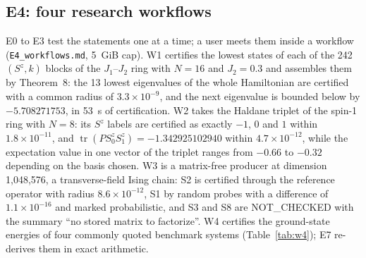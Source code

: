 \documentclass[11pt,a4paper]{article}
\newcommand{\code}[1]{\texttt{#1}}
\newcommand{\status}[1]{\textsf{#1}}
\newcommand{\NC}{\status{NOT\_CHECKED}}
\newcommand{\tr}{\operatorname{tr}}
\begin{document}
\subsection{E4: four research workflows}

E0 to E3 test the statements one at a time; a user meets them inside a workflow (\code{E4\_workflows.md}, 5~GiB cap).
W1 certifies the lowest states of each of the 242 $(S^z,k)$ blocks of the $J_1$--$J_2$ ring with $N=16$ and $J_2=0.3$
and assembles them by Theorem~8: the 13 lowest eigenvalues of the whole Hamiltonian are certified with a common radius
of $3.3\times10^{-9}$, and the next eigenvalue is bounded below by $-5.708271753$, in 53~s of certification. W2 takes
the Haldane triplet of the spin-1 ring with $N=8$: its $S^z$ labels are certified as exactly $-1$, $0$ and $1$ within
$1.8\times10^{-11}$, and $\tr(PS^z_0S^z_1)=-1.342925102940$ within $4.7\times10^{-12}$, while the expectation value in
one vector of the triplet ranges from $-0.66$ to $-0.32$ depending on the basis chosen. W3 is a matrix-free producer
at dimension 1,048,576, a transverse-field Ising chain: S2 is certified through the reference operator with radius
$8.6\times10^{-12}$, S1 by random probes with a difference of $1.1\times10^{-16}$ and marked probabilistic, and S3 and
S8 are \NC{} with the summary ``no stored matrix to factorize''. W4 certifies the ground-state energies of four
commonly quoted benchmark systems (Table~\ref{tab:w4}); E7 re-derives them in exact arithmetic.

\begin{table}[ht]
\centering\small
\caption{W4: certified ground-state energies, lower bounds on the gap to the next eigenvalue and S2 radii of four
benchmark systems in floating point (\code{E4\_workflows.md}, 3.2.1 run). Their exact re-check is
Table~\ref{tab:e7}.}
\label{tab:w4}
\end{table}
\end{document}
